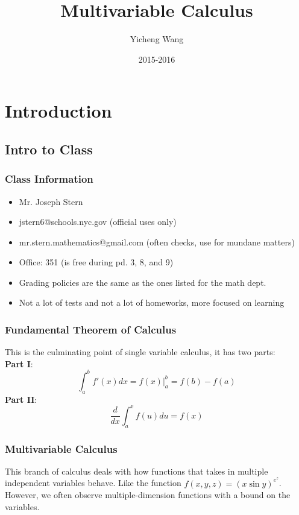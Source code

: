 \documentclass [12 pt, twoside] {book}
\newcommand\+{\text{ }}
\begin{document}
\frontmatter

\title{Multivariable Calculus}
\author{Yicheng Wang}
\date{2015-2016}

\maketitle
\newpage
\setcounter{tocdepth}{3}
\tableofcontents
\newpage
\chapter{Introduction}
\section*{Intro to Class}
\subsection*{Class Information}
\begin{itemize}
    \item Mr. Joseph Stern
    \item jstern6@schools.nyc.gov (official uses only)
    \item mr.stern.mathematics@gmail.com (often checks, use for mundane matters)
    \item Office: 351 (is free during pd. 3, 8, and 9)
    \item Grading policies are the same as the ones listed for the math dept.
    \item Not a lot of tests and not a lot of homeworks, more focused on learning
\end{itemize}

\subsection*{Fundamental Theorem of Calculus}
This is the culminating point of single variable calculus, it has two parts:\\
\textbf{Part I}:
$$\int_a^bf'(x)dx = f(x)\bigg|_a^b = f(b) - f(a)$$
\textbf{Part II}:
$$\frac{d}{dx}\int_a^x f(u)du = f(x)$$

\subsection*{Multivariable Calculus}
This branch of calculus deals with how functions that takes in multiple
independent variables behave. Like the function $f(x, y, z) = (x\sin{y})^{e^z}$.
However, we often observe multiple-dimension functions with a bound on the
variables.
\end{document}
